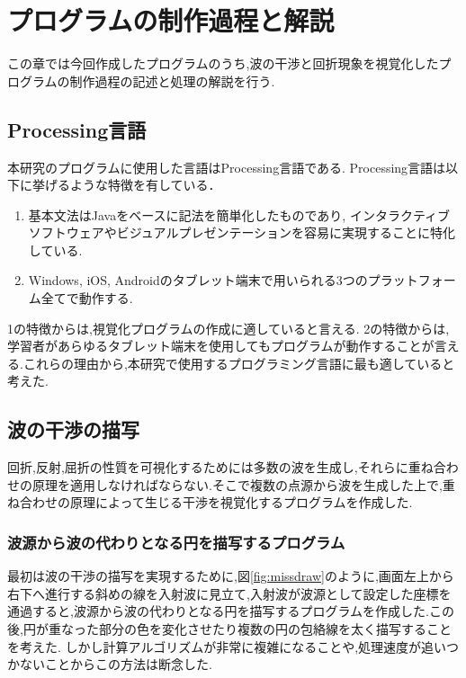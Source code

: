 
\chapter{プログラムの制作過程と解説}
この章では今回作成したプログラムのうち,波の干渉と回折現象を視覚化したプログラムの制作過程の記述と処理の解説を行う.
\section{Processing言語}
本研究のプログラムに使用した言語はProcessing言語である.
Processing言語は以下に挙げるような特徴を有している\cite{ishikawa}．
\begin{enumerate}
\item 基本文法はJavaをベースに記法を簡単化したものであり,
インタラクティブソフトウェアやビジュアルプレゼンテーションを容易に実現することに特化している.
\item Windows, iOS, Androidのタブレット端末で用いられる3つのプラットフォーム全てで動作する. %
\end{enumerate}
1の特徴からは,視覚化プログラムの作成に適していると言える.  2の特徴からは,学習者があらゆるタブレット端末を使用してもプログラムが動作することが言える.これらの理由から,本研究で使用するプログラミング言語に最も適していると考えた.

\section{波の干渉の描写}
回折,反射,屈折の性質を可視化するためには多数の波を生成し,それらに重ね合わせの原理を適用しなければならない.そこで複数の点源から波を生成した上で,重ね合わせの原理によって生じる干渉を視覚化するプログラムを作成した.

\subsection{波源から波の代わりとなる円を描写するプログラム}
最初は波の干渉の描写を実現するために,図\ref{fig:missdraw}のように,画面左上から右下へ進行する斜めの線を入射波に見立て,入射波が波源として設定した座標を通過すると,波源から波の代わりとなる円を描写するプログラムを作成した.この後,円が重なった部分の色を変化させたり複数の円の包絡線を太く描写することを考えた. しかし計算アルゴリズムが非常に複雑になることや,処理速度が追いつかないことからこの方法は断念した.

